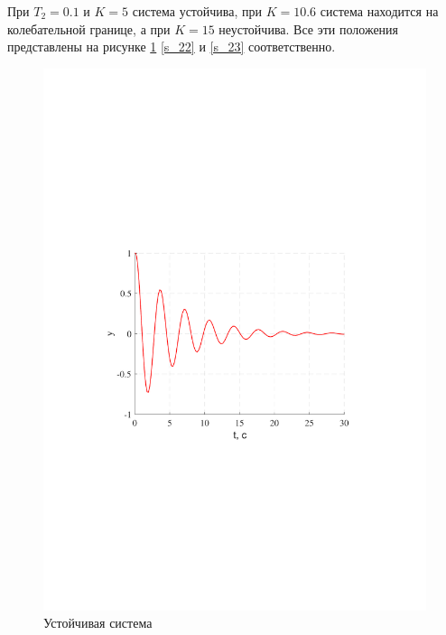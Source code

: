 \documentclass[a4paper,12pt]{article}
\begin{document}
	При $T_2=0.1$ и $K=5$ система устойчива, при $K=10.6$ система находится на колебательной границе, а при $K=15$ неустойчива. Все эти положения представлены на рисунке \ref{s_21} \ref{s_22} и \ref{s_23} соответственно.
	\begin{figure}[h!]
		\centering
			\includegraphics[width=6in]{UstoichivayaMOD.pdf}
			\caption{Устойчивая система}
			\label{s_21}
		\end{figure}
	\newpage			
\end{document}
